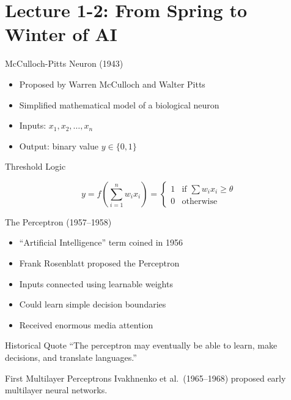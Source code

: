 \documentclass{beamer}
\begin{document}
\section{Lecture 1-2: From Spring to Winter of AI}

\begin{frame}{McCulloch-Pitts Neuron (1943)}

\begin{itemize}
\item Proposed by Warren McCulloch and Walter Pitts
\item Simplified mathematical model of a biological neuron
\item Inputs: $x_1,x_2,\ldots,x_n$
\item Output: binary value $y \in \{0,1\}$
\end{itemize}

\vspace{0.3cm}

\begin{block}{Threshold Logic}

\[
y =
f\left(
\sum_{i=1}^{n} w_i x_i
\right)
=
\begin{cases}
1 & \text{if } \sum w_i x_i \ge \theta \\
0 & \text{otherwise}
\end{cases}
\]

\end{block}

\end{frame}


\begin{frame}{The Perceptron (1957--1958)}

\begin{itemize}
\item ``Artificial Intelligence'' term coined in 1956
\item Frank Rosenblatt proposed the Perceptron
\item Inputs connected using learnable weights
\item Could learn simple decision boundaries
\item Received enormous media attention
\end{itemize}

\vspace{0.2cm}

\begin{exampleblock}{Historical Quote}
``The perceptron may eventually be able to learn, make decisions, and translate languages.''
\end{exampleblock}

\vspace{0.2cm}

\begin{block}{First Multilayer Perceptrons}
Ivakhnenko et al.\ (1965--1968) proposed early multilayer neural networks.
\end{block}

\end{frame}
\end{document}
